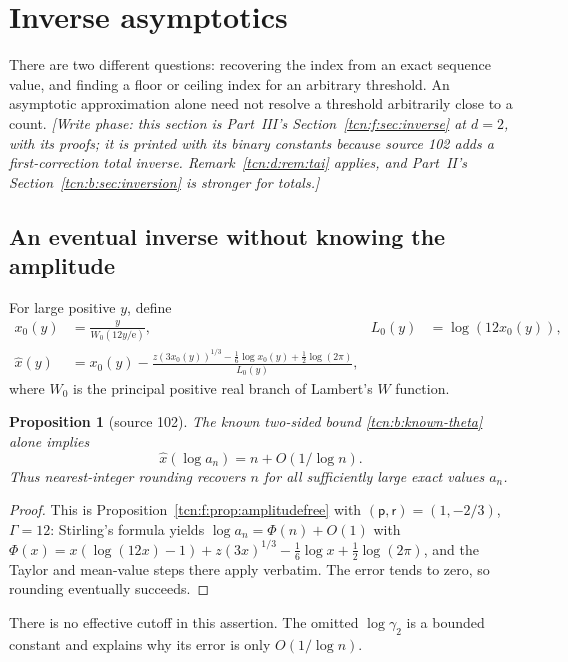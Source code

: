 \documentclass[11pt,letterpaper]{article}
\newcommand{\ee}{\mathrm e}
\newtheorem{proposition}[theorem]{Proposition}
\theoremstyle{remark}
\begin{document}
\section{Inverse asymptotics}\label{tcn:w:sec:inverse}
There are two different questions: recovering the index from an exact sequence value, and finding a floor or ceiling index for an arbitrary threshold. An asymptotic approximation alone need not resolve a threshold arbitrarily close to a count. \emph{[Write phase: this section is Part~III's Section~\ref{tcn:f:sec:inverse} at $d=2$, with its proofs; it is printed with its binary constants because source 102 adds a first-correction total inverse. Remark~\ref{tcn:d:rem:tai} applies, and Part~II's Section~\ref{tcn:b:sec:inversion} is stronger for totals.]}

\subsection{An eventual inverse without knowing the amplitude}
For large positive $y$, define
\begin{align}
 x_0(y)&=\frac{y}{W_0(12y/\ee)},&L_0(y)&=\log(12x_0(y)),\label{tcn:w:lambert}\\
 \hat x(y)&=x_0(y)-\frac{z(3x_0(y))^{1/3}-\tfrac16\log x_0(y)
                         +\tfrac12\log(2\pi)}{L_0(y)},\label{tcn:w:z}
\end{align}
where $W_0$ is the principal positive real branch of Lambert's $W$ function.
\begin{proposition}[source 102]\label{tcn:w:prop:inverse}
The known two-sided bound \eqref{tcn:b:known-theta} alone implies
\[
 \hat x(\log a_n)=n+O(1/\log n).
\]
Thus nearest-integer rounding recovers $n$ for all sufficiently large exact values $a_n$.
\end{proposition}
\begin{proof}
This is Proposition~\ref{tcn:f:prop:amplitudefree} with $(\mathsf p,\mathsf r)=(1,-2/3)$, $\Gamma=12$: Stirling's formula yields $\log a_n=\Phi(n)+O(1)$ with $\Phi(x)=x(\log(12x)-1)+z(3x)^{1/3}-\tfrac16\log x+\tfrac12\log(2\pi)$, and the Taylor and mean-value steps there apply verbatim. The error tends to zero, so rounding eventually succeeds.
\end{proof}
There is no effective cutoff in this assertion. The omitted $\log\gamma_2$ is a bounded constant and explains why its error is only $O(1/\log n)$.
\end{document}

